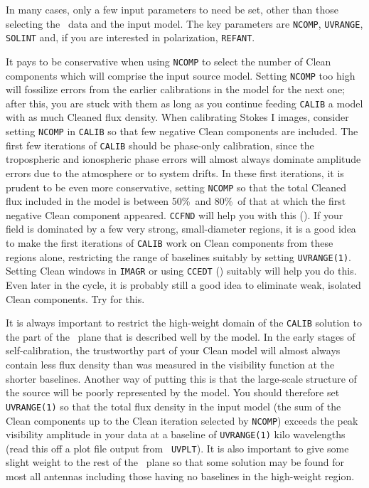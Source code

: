 
     In many cases, only a few input parameters to {\tt {}}
need be set, other than those selecting the \uv\ data and the input
model. The key parameters are {\tt NCOMP}, {\tt UVRANGE}, {\tt SOLINT}
and, if you are interested in polarization, {\tt REFANT}.

     It pays to be conservative when using {\tt NCOMP} to select the
number of Clean components which will comprise the input source model.
Setting {\tt NCOMP} too high will fossilize errors from the earlier
calibrations in the model for the next one; after this, you are stuck
with them as long as you continue feeding {\tt CALIB} a model with as
much Cleaned flux density.  When calibrating Stokes I images, consider
setting {\tt NCOMP} in {\tt CALIB} so that few negative Clean
components are included.  The first few iterations of {\tt CALIB}
should be phase-only calibration, since the tropospheric and
ionospheric phase errors will almost always dominate amplitude errors
due to the atmosphere or to system drifts.  In these first iterations,
it is prudent to be even more conservative, setting {\tt NCOMP} so
that the total Cleaned flux included in the model is between 50\%\ and
80\%\ of that at which the first negative Clean component appeared.
{\tt CCFND} will help you with this ().  If your field is
dominated by a few very strong, small-diameter regions, it is a good
idea to make the first iterations of {\tt CALIB} work on Clean
components from these regions alone, restricting the range of
baselines suitably by setting {\tt UVRANGE(1)}.  Setting Clean windows
in {\tt IMAGR} or using {\tt CCEDT} () suitably will help
you do this.  Even later in the  cycle, it is
probably still a good idea to eliminate weak, isolated Clean
components.  Try {\tt {}} for this.

     It is always important to restrict the high-weight domain of the
{\tt CALIB} solution to the part of the \uv\ plane that is described
well by the model.  In the early stages of self-calibration, the
trustworthy part of your Clean model will almost always contain less
flux density than was measured in the visibility function at the
shorter baselines.  Another way of putting this is that the
large-scale structure of the source will be poorly represented by the
model.  You should therefore set {\tt UVRANGE(1)} so that the total
flux density in the input model (the sum of the Clean components up to
the Clean iteration selected by {\tt NCOMP}) exceeds the peak
visibility amplitude in your data at a baseline of {\tt UVRANGE(1)}
kilo wavelengths (read this off a plot file output from {\tt
UVPLT})\@.  It is also important to give some slight weight to the
rest of the \uv\ plane so that some solution may be found for most all
antennas including those having no baselines in the high-weight
region.

